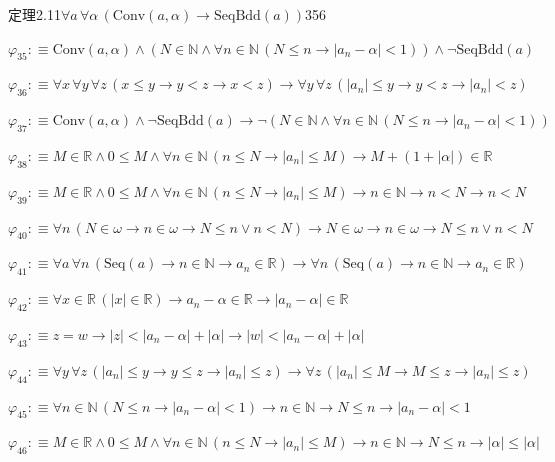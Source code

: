 \begin{fullproof}{定理2.11}{$\forall a\,\forall \alpha\,(\mathrm{Conv}(a,\alpha) \to \mathrm{SeqBdd}(a))$}{356}
\begin{abbrevlist}
\item $\varphi_{35} :\equiv \mathrm{Conv}(a,\alpha) \land (N \in \mathbb{N} \land \forall n \in \mathbb{N}\,(N \leq n \to \lvert a_{n} - \alpha \rvert < 1)) \land \neg \mathrm{SeqBdd}(a)$
\item $\varphi_{36} :\equiv \forall x\,\forall y\,\forall z\,(x \leq y \to y < z \to x < z) \to \forall y\,\forall z\,(\lvert a_{n} \rvert \leq y \to y < z \to \lvert a_{n} \rvert < z)$
\item $\varphi_{37} :\equiv \mathrm{Conv}(a,\alpha) \land \neg \mathrm{SeqBdd}(a) \to \neg (N \in \mathbb{N} \land \forall n \in \mathbb{N}\,(N \leq n \to \lvert a_{n} - \alpha \rvert < 1))$
\item $\varphi_{38} :\equiv M \in \mathbb{R} \land 0 \leq M \land \forall n \in \mathbb{N}\,(n \leq N \to \lvert a_{n} \rvert \leq M) \to M + (1 + \lvert \alpha \rvert) \in \mathbb{R}$
\item $\varphi_{39} :\equiv M \in \mathbb{R} \land 0 \leq M \land \forall n \in \mathbb{N}\,(n \leq N \to \lvert a_{n} \rvert \leq M) \to n \in \mathbb{N} \to n < N \to n < N$
\item $\varphi_{40} :\equiv \forall n\,(N \in \omega \to n \in \omega \to N \leq n \lor n < N) \to N \in \omega \to n \in \omega \to N \leq n \lor n < N$
\item $\varphi_{41} :\equiv \forall a\,\forall n\,(\mathrm{Seq}(a) \to n \in \mathbb{N} \to a_{n} \in \mathbb{R}) \to \forall n\,(\mathrm{Seq}(a) \to n \in \mathbb{N} \to a_{n} \in \mathbb{R})$
\item $\varphi_{42} :\equiv \forall x \in \mathbb{R}\,(\lvert x \rvert \in \mathbb{R}) \to a_{n} - \alpha \in \mathbb{R} \to \lvert a_{n} - \alpha \rvert \in \mathbb{R}$
\item $\varphi_{43} :\equiv z = w \to \lvert z \rvert < \lvert a_{n} - \alpha \rvert + \lvert \alpha \rvert \to \lvert w \rvert < \lvert a_{n} - \alpha \rvert + \lvert \alpha \rvert$
\item $\varphi_{44} :\equiv \forall y\,\forall z\,(\lvert a_{n} \rvert \leq y \to y \leq z \to \lvert a_{n} \rvert \leq z) \to \forall z\,(\lvert a_{n} \rvert \leq M \to M \leq z \to \lvert a_{n} \rvert \leq z)$
\item $\varphi_{45} :\equiv \forall n \in \mathbb{N}\,(N \leq n \to \lvert a_{n} - \alpha \rvert < 1) \to n \in \mathbb{N} \to N \leq n \to \lvert a_{n} - \alpha \rvert < 1$
\item $\varphi_{46} :\equiv M \in \mathbb{R} \land 0 \leq M \land \forall n \in \mathbb{N}\,(n \leq N \to \lvert a_{n} \rvert \leq M) \to n \in \mathbb{N} \to N \leq n \to \lvert \alpha \rvert \leq \lvert \alpha \rvert$

\end{abbrevlist}
\end{fullproof}
